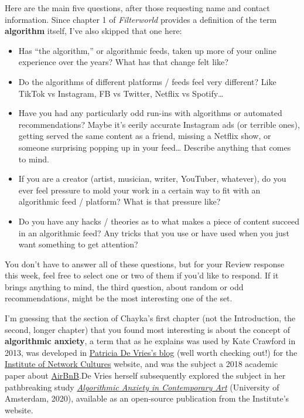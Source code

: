 \documentclass[
  letterpaper,
  DIV=11,
  numbers=noendperiod,
  oneside]{scrartcl}
\providecommand{\tightlist}{%
  \setlength{\itemsep}{0pt}\setlength{\parskip}{0pt}}\usepackage{longtable,booktabs,array}
\begin{document}
Here are the main five questions, after those requesting name and
contact information. Since chapter 1 of \emph{Filterworld} provides a
definition of the term \textbf{algorithm} itself, I've also skipped that
one here:

\begin{itemize}
\tightlist
\item
  Has ``the algorithm,'' or algorithmic feeds, taken up more of your
  online experience over the years? What has that change felt like?
\item
  Do the algorithms of different platforms / feeds feel very different?
  Like TikTok vs Instagram, FB vs Twitter, Netflix vs Spotify\ldots{}
\item
  Have you had any particularly odd run-ins with algorithms or automated
  recommendations? Maybe it's eerily accurate Instagram ads (or terrible
  ones), getting served the same content as a friend, missing a Netflix
  show, or someone surprising popping up in your feed\ldots{} Describe
  anything that comes to mind.
\item
  If you are a creator (artist, musician, writer, YouTuber, whatever),
  do you ever feel pressure to mold your work in a certain way to fit
  with an algorithmic feed / platform? What is that pressure like?
\item
  Do you have any hacks / theories as to what makes a piece of content
  succeed in an algorithmic feed? Any tricks that you use or have used
  when you just want something to get attention?
\end{itemize}

You don't have to answer all of these questions, but for your Review
response this week, feel free to select one or two of them if you'd like
to respond. If it brings anything to mind, the third question, about
random or odd recommendations, might be the most interesting one of the
set.

I'm guessing that the section of Chayka's first chapter (not the
Introduction, the second, longer chapter) that you found most
interesting is about the concept of \textbf{algorithmic anxiety}, a term
that as he explains was used by Kate Crawford in 2013, was developed in
\href{https://networkcultures.org/contesting-capture-technology/}{Patricia
De Vries's blog} (well worth checking out!) for the
\href{https://networkcultures.org/}{Institute of Network Cultures}
website, and was the subject a 2018 academic paper about
\href{https://shagunjhaver.com/research/articles/jhaver-2018-airbnb/jhaver-2018-airbnb.pdf}{AirBnB}.De
Vries herself subsequently explored the subject in her pathbreaking
study
\href{https://networkcultures.org/blog/publication/tod33-algorithmic-anxiety-in-contemporary-art-a-kierkegaardian-inquiry-into-the-imaginary-of-possibility/}{\emph{Algorithmic
Anxiety in Contemporary Art}} (University of Amsterdam, 2020), available
as an open-source publication from the Institute's website.
\end{document}
